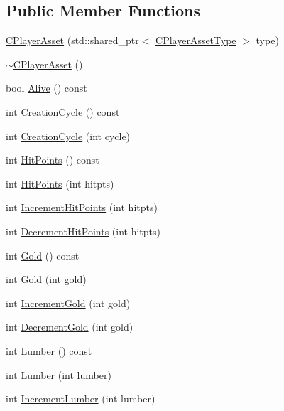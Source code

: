 \subsection*{Public Member Functions}
\begin{DoxyCompactItemize}
\item 
\hyperlink{classCPlayerAsset_a84787ab2502e70d52c5b73b51ba9063a}{C\+Player\+Asset} (std\+::shared\+\_\+ptr$<$ \hyperlink{classCPlayerAssetType}{C\+Player\+Asset\+Type} $>$ type)
\item 
\hyperlink{classCPlayerAsset_a5dbb83d6431454644f98d46c6348dfb8}{$\sim$\+C\+Player\+Asset} ()
\item 
bool \hyperlink{classCPlayerAsset_a616d6139b57b9e74cca2559d7501ad3e}{Alive} () const
\item 
int \hyperlink{classCPlayerAsset_ab1667cc26c3439f868708af9d0fc1bda}{Creation\+Cycle} () const
\item 
int \hyperlink{classCPlayerAsset_a101a234ccd90537c2900cde093bc8708}{Creation\+Cycle} (int cycle)
\item 
int \hyperlink{classCPlayerAsset_a605862c6f6e57a2c6e21030d716485bd}{Hit\+Points} () const
\item 
int \hyperlink{classCPlayerAsset_a5da6f77ba278109e159d392035f4e1dd}{Hit\+Points} (int hitpts)
\item 
int \hyperlink{classCPlayerAsset_a101767304149c0d1c1b0b88cf8e09b36}{Increment\+Hit\+Points} (int hitpts)
\item 
int \hyperlink{classCPlayerAsset_a34aa2679bb9d5d2d46774b8e7210fe53}{Decrement\+Hit\+Points} (int hitpts)
\item 
int \hyperlink{classCPlayerAsset_a03ee2a60c0d332675b4b30573b96d64f}{Gold} () const
\item 
int \hyperlink{classCPlayerAsset_a97976cb3f9db851ecaf2a78c268dce32}{Gold} (int gold)
\item 
int \hyperlink{classCPlayerAsset_afe41876166e7a3ad8d3d5465595d3de7}{Increment\+Gold} (int gold)
\item 
int \hyperlink{classCPlayerAsset_ab29218b9af24ca9db186ee36f75ae7d4}{Decrement\+Gold} (int gold)
\item 
int \hyperlink{classCPlayerAsset_aeaf2bc68dac6348ef48c2c49703325ad}{Lumber} () const
\item 
int \hyperlink{classCPlayerAsset_a66a1a78326ba5d6e2892920cbfddebc6}{Lumber} (int lumber)
\item 
int \hyperlink{classCPlayerAsset_a12855b5c0cddb6b72e5ecba92ae77223}{Increment\+Lumber} (int lumber)
\item 

\end{DoxyCompactItemize}
